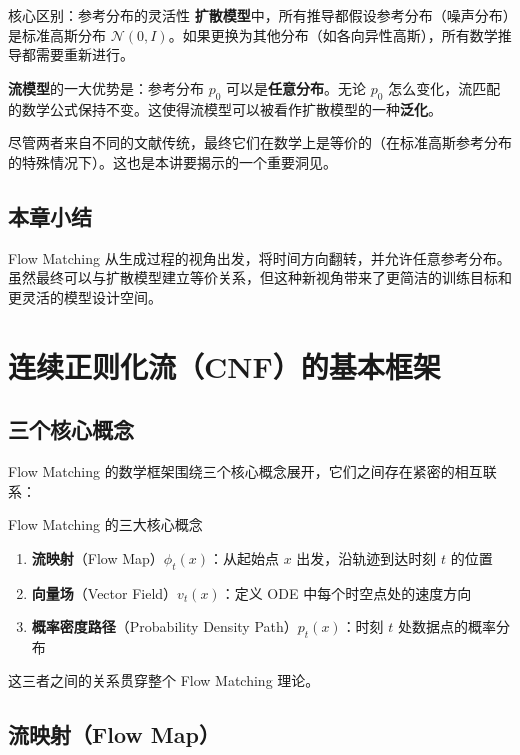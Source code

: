 \documentclass[a4paper]{article}
\begin{document}
\begin{importantbox}{核心区别：参考分布的灵活性}
\textbf{扩散模型}中，所有推导都假设参考分布（噪声分布）是标准高斯分布 $\mathcal{N}(0, I)$。如果更换为其他分布（如各向异性高斯），所有数学推导都需要重新进行。

\textbf{流模型}的一大优势是：参考分布 $p_0$ 可以是\textbf{任意分布}。无论 $p_0$ 怎么变化，流匹配的数学公式保持不变。这使得流模型可以被看作扩散模型的一种\textbf{泛化}。
\end{importantbox}

尽管两者来自不同的文献传统，最终它们在数学上是等价的（在标准高斯参考分布的特殊情况下）。这也是本讲要揭示的一个重要洞见。

\subsection{本章小结}

Flow Matching 从生成过程的视角出发，将时间方向翻转，并允许任意参考分布。虽然最终可以与扩散模型建立等价关系，但这种新视角带来了更简洁的训练目标和更灵活的模型设计空间。

\section{连续正则化流（CNF）的基本框架}

\subsection{三个核心概念}

Flow Matching 的数学框架围绕三个核心概念展开，它们之间存在紧密的相互联系：

\begin{importantbox}{Flow Matching 的三大核心概念}
\begin{enumerate}
    \item \textbf{流映射}（Flow Map）$\phi_t(x)$：从起始点 $x$ 出发，沿轨迹到达时刻 $t$ 的位置
    \item \textbf{向量场}（Vector Field）$v_t(x)$：定义 ODE 中每个时空点处的速度方向
    \item \textbf{概率密度路径}（Probability Density Path）$p_t(x)$：时刻 $t$ 处数据点的概率分布
\end{enumerate}
这三者之间的关系贯穿整个 Flow Matching 理论。
\end{importantbox}

\subsection{流映射（Flow Map）}
\end{document}
